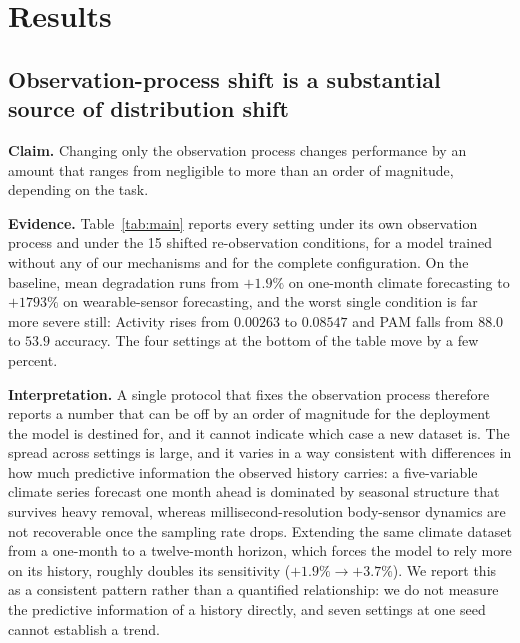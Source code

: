 
\section{Results}
\label{sec:results}

\subsection{Observation-process shift is a substantial source of distribution shift}
\label{sec:q-shift}

\textbf{Claim.} Changing only the observation process changes performance by an amount that ranges from
negligible to more than an order of magnitude, depending on the task.

\textbf{Evidence.} Table~\ref{tab:main} reports every setting under its own observation process and under the 15
shifted re-observation conditions, for a model trained without any of our mechanisms and for the complete
configuration.
On the baseline, mean degradation runs from $+1.9\%$ on one-month climate forecasting to $+1793\%$ on
wearable-sensor forecasting, and the worst single condition is far more severe still: Activity rises from
$0.00263$ to $0.08547$ and PAM falls from $88.0$ to $53.9$ accuracy. The four settings at the bottom of the table
move by a few percent.

\textbf{Interpretation.} A single protocol that fixes the observation process therefore reports a number that can
be off by an order of magnitude for the deployment the model is destined for, and it cannot indicate which case a
new dataset is. The spread across settings is large, and it varies in a way consistent with differences in how
much predictive information the observed history carries: a five-variable climate series forecast one month ahead
is dominated by seasonal structure that survives heavy removal, whereas millisecond-resolution body-sensor
dynamics are not recoverable once the sampling rate drops. Extending the same climate dataset from a one-month to
a twelve-month horizon, which forces the model to rely more on its history, roughly doubles its sensitivity
($+1.9\%\rightarrow+3.7\%$). We report this as a consistent pattern rather than a quantified relationship: we do
not measure the predictive information of a history directly, and seven settings at one seed cannot establish a
trend.

